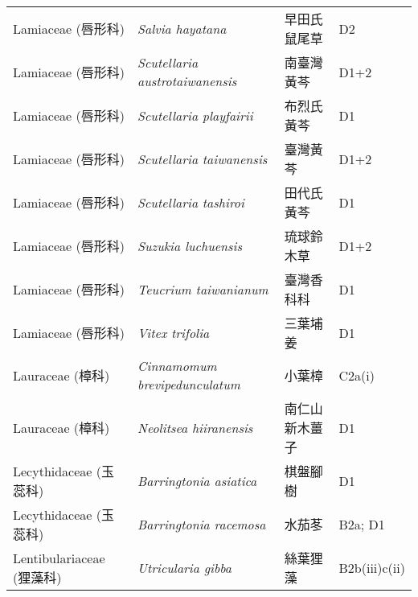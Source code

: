 \begin{longtable}{p{3cm}p{5cm}p{3cm}p{4cm}}
    Lamiaceae (唇形科) & \textit{Salvia hayatana}  & 早田氏鼠尾草 & D2　 \index{Salvia@\textit{Salvia}!hayatana@\textit{hayatana}}  \index{早田氏鼠尾草} \\
    Lamiaceae (唇形科) & \textit{Scutellaria austrotaiwanensis}  & 南臺灣黃芩 & D1+2 \index{Scutellaria@\textit{Scutellaria}!austrotaiwanensis@\textit{austrotaiwanensis}}  \index{南臺灣黃芩} \\
    Lamiaceae (唇形科) & \textit{Scutellaria playfairii}  & 布烈氏黃芩 & D1 \index{Scutellaria@\textit{Scutellaria}!playfairii@\textit{playfairii}}  \index{布烈氏黃芩} \\
    Lamiaceae (唇形科) & \textit{Scutellaria taiwanensis}  & 臺灣黃芩 & D1+2 \index{Scutellaria@\textit{Scutellaria}!taiwanensis@\textit{taiwanensis}}  \index{臺灣黃芩} \\
    Lamiaceae (唇形科) & \textit{Scutellaria tashiroi}  & 田代氏黃芩 & D1 \index{Scutellaria@\textit{Scutellaria}!tashiroi@\textit{tashiroi}}  \index{田代氏黃芩} \\
    Lamiaceae (唇形科) & \textit{Suzukia luchuensis}  & 琉球鈴木草 & D1+2 \index{Suzukia@\textit{Suzukia}!luchuensis@\textit{luchuensis}}  \index{琉球鈴木草} \\
    Lamiaceae (唇形科) & \textit{Teucrium taiwanianum}  & 臺灣香科科 & D1 \index{Teucrium@\textit{Teucrium}!taiwanianum@\textit{taiwanianum}}  \index{臺灣香科科} \\
    Lamiaceae (唇形科) & \textit{Vitex trifolia}  & 三葉埔姜 & D1 \index{Vitex@\textit{Vitex}!trifolia@\textit{trifolia}}  \index{三葉埔姜} \\
    Lauraceae (樟科) & \textit{Cinnamomum brevipedunculatum}  & 小葉樟 & C2a(i) \index{Cinnamomum@\textit{Cinnamomum}!brevipedunculatum@\textit{brevipedunculatum}}  \index{小葉樟} \\
    Lauraceae (樟科) & \textit{Neolitsea hiiranensis}  & 南仁山新木薑子 & D1 \index{Neolitsea@\textit{Neolitsea}!hiiranensis@\textit{hiiranensis}}  \index{南仁山新木薑子} \\
    Lecythidaceae (玉蕊科) & \textit{Barringtonia asiatica}  & 棋盤腳樹 & D1 \index{Barringtonia@\textit{Barringtonia}!asiatica@\textit{asiatica}}  \index{棋盤腳樹} \\
    Lecythidaceae (玉蕊科) & \textit{Barringtonia racemosa}  & 水茄苳 & B2a; D1 \index{Barringtonia@\textit{Barringtonia}!racemosa@\textit{racemosa}}  \index{水茄苳} \\
    Lentibulariaceae (狸藻科) & \textit{Utricularia gibba}  & 絲葉狸藻 & B2b(iii)c(ii) \index{Utricularia@\textit{Utricularia}!gibba@\textit{gibba}}  \index{絲葉狸藻} \\

\end{longtable}
